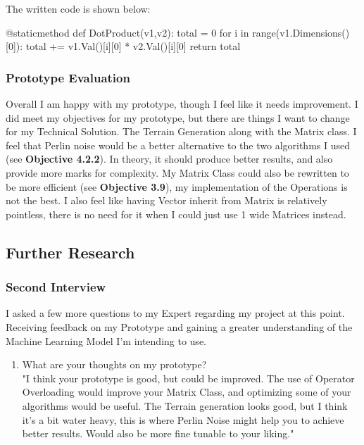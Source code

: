 \begin{flushleft}
\begin{enumerate}
                        The written code is shown below:
                        \begin{pythoncode}
@staticmethod
def DotProduct(v1,v2):
    total = 0
    for i in range(v1.Dimensions()[0]):
        total += v1.Val()[i][0] * v2.Val()[i][0]
    return total
                        \end{pythoncode}
                \end{enumerate}
            \subsubsection{Prototype Evaluation}
                \vspace{0.2cm}
                Overall I am happy with my prototype, though I feel like it needs improvement. I did meet my 
                objectives for my prototype, but there are things I want to change for my Technical Solution. 
                The Terrain Generation along with the Matrix class. I feel that Perlin noise would be a better alternative
                to the two algorithms I used (see \textbf{Objective 4.2.2}). In theory, it should produce better results, and also provide more marks for 
                complexity. My Matrix Class could also be rewritten to be more efficient (see \textbf{Objective 3.9}), my implementation of the Operations is not the best.
                I also feel like having Vector inherit from Matrix is relatively pointless, there is no need for it when I could just use 
                1 wide Matrices instead.
        \subsection{Further Research}
            \subsubsection{Second Interview}
                I asked a few more questions to my Expert regarding my project at this point. Receiving feedback on my Prototype and gaining a
                greater understanding of the Machine Learning Model I'm intending to use. \\
                \vspace{0.2cm}

                \begin{enumerate}
                    \item What are your thoughts on my prototype? \\ 
                        \vspace{0.2cm}
                        "I think your prototype is good, but could be improved. The use of Operator Overloading would improve your Matrix Class,
                        and optimizing some of your algorithms would be useful. The Terrain generation looks good, but I think it's a bit
                        water heavy, this is where Perlin Noise might help you to achieve better results. Would also be more fine tunable to
                        your liking."


\end{enumerate}
\end{flushleft}
